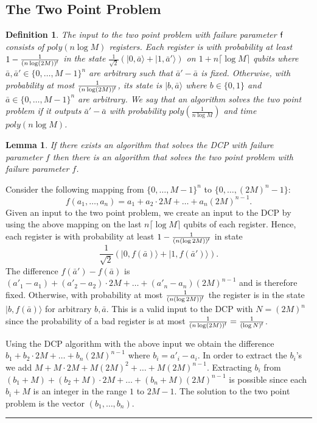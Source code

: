 \documentclass[11pt]{article}
\newtheorem{definition}[theorem]{Definition}
\newtheorem{lemma}[theorem]{Lemma}
\newcommand{\qedsymb}{\hfill{\rule{2mm}{2mm}}}
\newenvironment{proof}{\begin{trivlist}
\item[\hspace{\labelsep}{\sl\noindent Proof:\/}]
}{\qedsymb\end{trivlist}}
\newcommand\ket[1]{{ |{#1} \rangle }}
\newcommand\alternate[2]{{#1}}
\newcommand\omittedproof[1]{\alternate{#1}{Omitted.}}
\begin{document}
\subsection{The Two Point Problem}\label{sec_2pp}

\begin{definition}
The input to the two point problem with failure parameter ${\sf f}$ consists of $poly(n\log M)$ registers. Each
register is with probability at least $1-\frac{1}{(n \log (2M))^{\sf f}}$ in the state
$\frac{1}{\sqrt{2}}(\ket{0,\bar{a}}+\ket{1,\bar{a}'})$ on $1+n \lceil \log M \rceil$ qubits where $\bar{a},\bar{a}'\in
\{0,\ldots,M-1\}^n$ are arbitrary such that $\bar{a}'-\bar{a}$ is fixed. Otherwise, with probability at most
$\frac{1}{(n \log (2M))^{\sf f}}$, its state is $\ket{b,\bar{a}}$ where $b\in\{0,1\}$ and $\bar{a} \in
\{0,\ldots,M-1\}^n$ are arbitrary. We say that an algorithm solves the two point problem if it outputs
$\bar{a}'-\bar{a}$ with probability $poly(\frac{1}{n\log M})$ and time $poly(n\log M)$.
\end{definition}

\begin{lemma}\label{n_dimensional_2pp}
If there exists an algorithm that solves the DCP with failure parameter $f$ then there is an algorithm that solves the
two point problem with failure parameter $f$.
\end{lemma}
\begin{proof}\omittedproof{
Consider the following mapping from $\{0,\ldots,M-1\}^n$ to $\{0,\ldots,(2M)^n-1\}$:
$$f(a_1,\ldots,a_n) = a_1+a_2\cdot 2M + \ldots + a_n (2M)^{n-1}.$$
Given an input to the two point problem, we create an input to the DCP by using the above mapping on the last $n\lceil
\log M \rceil$ qubits of each register. Hence, each register is with probability at least $1-\frac{1}{(n(\log 2M))^{\sf
f}}$ in state
 $$\frac{1}{\sqrt{2}} (\ket{0,f(\bar{a})} + \ket{1,f(\bar{a}')}).$$
The difference $f(\bar{a}')-f(\bar{a})$ is $(a'_1-a_1)+(a'_2-a_2)\cdot 2M + \ldots + (a'_n-a_n) (2M)^{n-1}$ and is
therefore fixed. Otherwise, with probability at most $\frac{1}{(n(\log 2M))^{\sf f}}$ the register is in the state
$\ket{b,f(\bar{a})}$ for arbitrary $b,\bar{a}$. This is a valid input to the DCP with $N=(2M)^{n}$ since the
probability of a bad register is at most $\frac{1}{(n \log (2M))^{\sf f}} = \frac{1}{(\log N)^{\sf f}}$.

Using the DCP algorithm with the above input we obtain the difference $b_1+b_2 \cdot 2M + \ldots + b_n (2M)^{n-1}$
where $b_i=a'_i-a_i$. In order to extract the $b_i$'s we add $M+M\cdot 2M + M(2M)^2+\ldots+M(2M)^{n-1}$. Extracting
$b_i$ from $(b_1+M)+(b_2+M) \cdot 2M + \ldots + (b_n+M) (2M)^{n-1}$ is possible since each $b_i + M$ is an integer in
the range $1$ to $2M-1$. The solution to the two point problem is the vector $(b_1,\ldots,b_n)$. }\end{proof}
\end{document}
